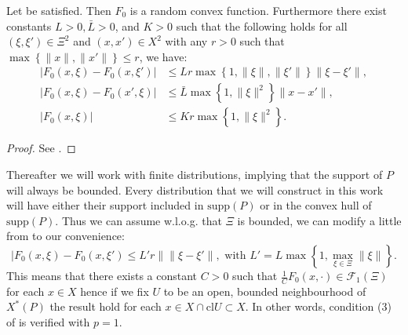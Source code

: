 \documentclass{amsart}
\begin{document}
\begin{proposition}\label{prop 2}
    Let  be satisfied. Then $F_0$ is a random convex function. Furthermore there exist constants $L>0, \bar{L}>0$, and $K>0$ such that the following holds for all $\left(\xi,\xi'\right)\in\Xi^2$ and $\left(x,x'\right)\in X^2$ with any $r>0$ such that $\max\left\{\lVert x\rVert, \lVert x' \rVert\right\}\leq r$, we have:
    \begin{align}
        \lvert F_0\left(x,\xi\right)- F_0\left(x,\xi'\right)\rvert &\leq Lr\max\left\{1,\lVert \xi\rVert, \lVert \xi'\rVert\right\}\lVert \xi-\xi'\rVert, \label{lips}\\
        \lvert F_0\left(x,\xi\right)- F_0\left(x',\xi\right)\rvert &\leq \bar{L}\max\left\{1,\lVert\xi\rVert^2\right\}\lVert x-x'\rVert, \nonumber \\
        \lvert F_0\left(x,\xi\right) \rvert&\leq Kr\max\left\{1,\lVert\xi\rVert^2\right\} \nonumber.
    \end{align}
     
\end{proposition}
\begin{proof}
    See \cite[Proposition 22]{romisch_stability_2003}.
\end{proof}
Thereafter we will work with finite distributions, implying that the support of $P$ will always be bounded. Every distribution that we will construct in this work will have either their support included in $\text{supp}\left(P\right)$ or in the convex hull of $\text{supp}\left(P\right)$. Thus we can assume w.l.o.g. that $\Xi$ is bounded, we can modify a little  from  to our convenience:
$$
\lvert F_0\left(x,\xi\right)- F_0\left(x,\xi'\right) \leq L'r \lVert \lVert \xi-\xi'\rVert, \text{ with } L'=L\max\left\{1,\max_{\xi\in\Xi}\lVert\xi\rVert\right\}.
$$
This means that there exists a constant $C>0$ such that $\frac{1}{C}F_0\left(x,\cdot\right)\in\mathcal{F}_1\left(\Xi\right)$ for each $x\in X$ hence if we fix $U$ to be an open, bounded neighbourhood of $X^*\left(P\right)$ the result hold for each $x\in X\cap \text{cl}U\subset X$. In other words, condition (3) of  is verified with $p=1$.
\end{document}
